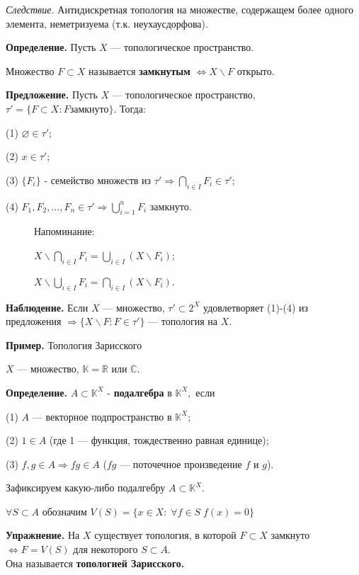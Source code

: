 \documentclass[12pt,a4paper]{article}
\begin{document}
\textit{Следствие.} Антидискретная топология на множестве, содержащем более одного элемента, неметризуема (т.к. неухаусдорфова).

\textbf{Определение.} Пусть $X$ --- топологическое пространство.

Множество $F \subset X$ называется \textbf{замкнутым} $\Leftrightarrow X \backslash F$ открыто.

\textbf{Предложение.} Пусть $X$ --- топологическое пространство, $\tau' = \{ F \subset X: F \text{замкнуто}\}$. Тогда:

(1) $\varnothing \in \tau';$

(2) $x \in \tau';$

(3) $\{F_i\}$ - семейство множеств из $\tau' \Rightarrow \bigcap_{i \in I} F_i \in \tau';$

(4) $F_1, F_2, ..., F_n \in \tau' \Rightarrow \bigcup^n_{i = 1} F_i$ замкнуто.

\begin{figure}
	Напоминание:
	
	$X \backslash \bigcap_{i \in I} F_i = \bigcup_{i \in I}\left( X \backslash F_i \right);$
	
	$X \backslash \bigcup_{i \in I} F_i = \bigcap_{i \in I}\left( X \backslash F_i \right).$
\end{figure}


\textbf{Наблюдение.} Если $X$ --- множество, $\tau' \subset 2^X$ удовлетворяет (1)-(4) из предложения $\Rightarrow \{X \backslash F \colon F \in \tau'\}$ --- топология на $X.$

\textbf{Пример.} Топология Зарисского

$X$ --- множество, $\mathbb{K} = \mathbb{R}$ или $\mathbb{C}$.

\textbf{Определение.} $A \subset \mathbb{K}^X$ - \textbf{подалгебра} в $\mathbb{K}^X,$ если

(1) $A$ --- векторное подпространство в $\mathbb{K}^X;$

(2) $1 \in A$ (где 1 --- функция, тождественно равная единице);

(3) $f, g \in A \Rightarrow fg \in A$ ($fg$ --- поточечное произведение $f$ и $g$).

Зафиксируем какую-либо подалгебру $A \subset \mathbb{K}^X.$

$\forall S \subset A$ обозначим $V(S) = \{ x \in X: \; \forall f \in S \; f(x) = 0 \}$ 

\textbf{Упражнение.} На $X$ существует топология, в которой $F \subset X$ замкнуто $\Leftrightarrow F = V(S)$ для некоторого $S \subset A$. \\Она называется \textbf{топологией Зарисского.}
\end{document}

